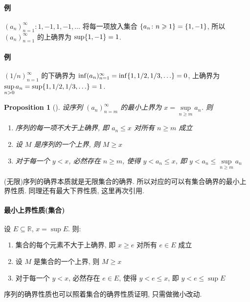 \documentclass[UTF8]{ctexart}
\theoremstyle{mystyle}
\newtheorem{proposition}{Proposition}[section]
\theoremstyle{myremark}
\theoremstyle{plain}
\newcommand{\R}{\mathbb R}
\DeclarePairedDelimiter\set{\{}{\}}
\begin{document}
\paragraph{例}
$ (a_n)_{n = 1}^\infty \colon 1, -1, 1, -1, \dots $ 将每一项放入集合 $ \set{a_n \colon n \geqslant 1} = \set{1, -1} $, 所以 $ (a_n)_{n = 1}^\infty $ 的上确界为 $ \sup\set{1, -1} = 1 $.

\paragraph{例}
$ (1/n)_{n = 1}^\infty $ 的下确界为 $ \inf (a_n)_{n = 1}^\infty = \inf\set{1, 1/2, 1/3, \dots} = 0 $, 上确界为 $ \sup\limits_{n > 0} a_n = \sup\set{1, 1/2, 1/3, \dots} = 1 $.


\begin{proposition}[]
    设序列 $ (a_n)_{n = m}^\infty $ 的最小上界为 $ x = \sup\limits_{n \geqslant m} a_n $. 则
    \begin{enumerate}
        \item 序列的每一项不大于上确界, 即 $ a_n \leqslant x $ 对所有 $ n \geqslant m $ 成立
        \item 设 $ M $ 是序列的一个上界, 则 $ M \geqslant x $
        \item 对于每一个 $ y < x $, 必然存在 $ n \geqslant m $, 使得 $ y < a_n \leqslant x $, 即 $ y < a_n \leqslant \sup\limits_{n \geqslant m} a_n $
    \end{enumerate}
\end{proposition}

(无限)序列的确界本质就是无限集合的确界. 所以对应的可以有集合确界的最小上界性质. 同理还有最大下界性质, 这里再次引用.

\paragraph{最小上界性质(集合)}
    设 $ E \subseteq \R $, $ x = \sup E $. 则:
    \begin{enumerate}
        \item 集合的每个元素不大于上确界, 即 $ x \geqslant e $ 对所有 $ e \in E $ 成立
        \item 设 $ M $ 是集合的一个上界, 则 $ M \geqslant x $
        \item 对于每一个 $ y < x $, 必然存在 $ e \in E $, 使得 $ y < e \leqslant x $, 即 $ y < e \leqslant \sup E $
    \end{enumerate}


序列的确界性质也可以照着集合的确界性质证明, 只需做微小改动.
\end{document}
